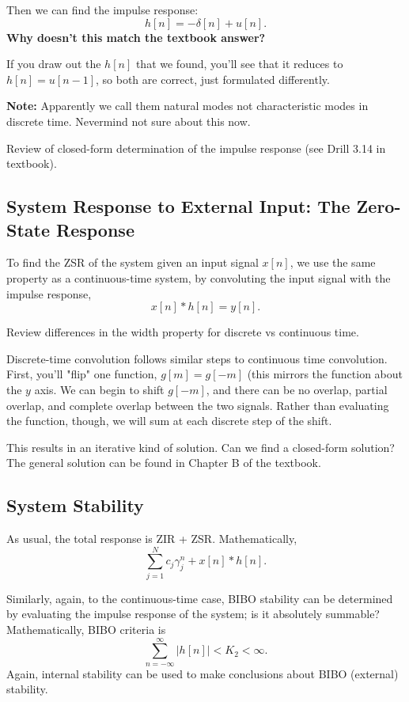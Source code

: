 \documentclass{article}
\begin{document}
Then we can find the impulse response:
\[
	h[n] = -\delta[n] + u[n].
\]
\textbf{Why doesn't this match the textbook answer?}

If you draw out the \(h[n]\) that we found, you'll see that it reduces to \(h[n] = u[n-1]\), so both are correct, just formulated differently.

\textbf{Note:} Apparently we call them natural modes not characteristic modes in discrete time. Nevermind not sure about this now.

Review of closed-form determination of the impulse response (see Drill 3.14 in textbook).

\subsection{System Response to External Input: The Zero-State Response}

To find the ZSR of the system given an input signal \(x[n]\), we use the same property as a continuous-time system, by convoluting the input signal with the impulse response, 
\[
	x[n] * h[n] = y[n].
\]

Review differences in the width property for discrete vs continuous time.

Discrete-time convolution follows similar steps to continuous time convolution. First, you'll "flip" one function, \(g[m] = g[-m]\) (this mirrors the function about the \(y\) axis. We can begin to shift \(g[-m]\), and there can be no overlap, partial overlap, and complete overlap between the two signals. Rather than evaluating the function, though, we will sum at each discrete step of the shift.

This results in an iterative kind of solution. Can we find a closed-form solution? The general solution can be found in Chapter B of the textbook.

\subsection{System Stability}

As usual, the total response is ZIR + ZSR. Mathematically,
\[
	\sum_{j=1}^{N}c_j\gamma_j^n + x[n] * h[n].
\]

Similarly, again, to the continuous-time case, BIBO stability can be determined by evaluating the impulse response of the system; is it absolutely summable? Mathematically, BIBO criteria is
\[
	\sum_{n=-\infty}^{\infty}|h[n]| < K_2 < \infty.
\]
Again, internal stability can be used to make conclusions about BIBO (external) stability.
\end{document}
